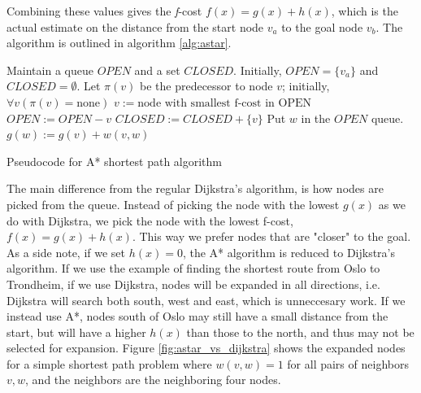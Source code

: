 Combining these values gives the {\textit f-cost} $f(x) = g(x)+h(x)$, which is the actual estimate on the distance from the start node $v_a$ to the goal node $v_b$. The algorithm is outlined in algorithm \ref{alg:astar}.

\begin{algorithm}
\begin{algorithmic}
\STATE Maintain a queue $OPEN$ and a set $CLOSED$. 
\STATE Initially, $OPEN = \{v_a\}$ and $CLOSED = \emptyset$. 
\STATE Let $\pi(v)$ be the predecessor to node $v$; initially, $\forall v (\pi(v) = \mbox{none})$ 
    \STATE $v := \mbox{node with smallest f-cost in OPEN}$
    \STATE $OPEN:= OPEN - {v}$
    \STATE $CLOSED := CLOSED + \{v\}$
            \STATE Put $w$ in the $OPEN$ queue.
            \STATE $g(w) := g(v)+w(v,w)$
        \ENDIF
    \ENDFOR
\ENDWHILE
\end{algorithmic}
\caption{Pseudocode for A* shortest path algorithm}
\label{alg:astar}
\end{algorithm}

The main difference from the regular Dijkstra's algorithm, is how nodes are picked from the queue. Instead of picking the node with the lowest $g(x)$ as we do with Dijkstra, we pick the node with the lowest f-cost, $f(x) = g(x) + h(x)$. This way we prefer nodes that are "closer" to the goal. As a side note, if we set $h(x)=0$, the A* algorithm is reduced to Dijkstra's algorithm. If we use the example of finding the shortest route from Oslo to Trondheim, if we use Dijkstra, nodes will be expanded in all directions, i.e. Dijkstra will search both south, west and east, which is unneccesary work. If we instead use A*, nodes south of Oslo may still have a small distance from the start, but will have a higher $h(x)$ than those to the north, and thus may not be selected for expansion. Figure \ref{fig:astar_vs_dijkstra} shows the expanded nodes for a simple shortest path problem where $w(v,w)=1$ for all pairs of neighbors $v,w$, and the neighbors are the neighboring four nodes.

